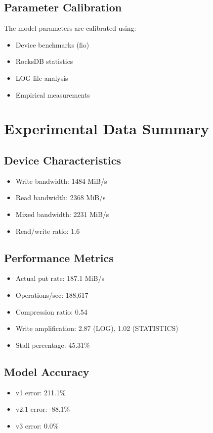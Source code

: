 \documentclass[11pt]{article}
\begin{document}
\subsection{Parameter Calibration}

The model parameters are calibrated using:
\begin{itemize}
    \item Device benchmarks (fio)
    \item RocksDB statistics
    \item LOG file analysis
    \item Empirical measurements
\end{itemize}

\section{Experimental Data Summary}

\subsection{Device Characteristics}
\begin{itemize}
    \item Write bandwidth: 1484 MiB/s
    \item Read bandwidth: 2368 MiB/s
    \item Mixed bandwidth: 2231 MiB/s
    \item Read/write ratio: 1.6
\end{itemize}

\subsection{Performance Metrics}
\begin{itemize}
    \item Actual put rate: 187.1 MiB/s
    \item Operations/sec: 188,617
    \item Compression ratio: 0.54
    \item Write amplification: 2.87 (LOG), 1.02 (STATISTICS)
    \item Stall percentage: 45.31\%
\end{itemize}

\subsection{Model Accuracy}
\begin{itemize}
    \item v1 error: 211.1\%
    \item v2.1 error: -88.1\%
    \item v3 error: 0.0\%
\end{itemize}
\end{document}
